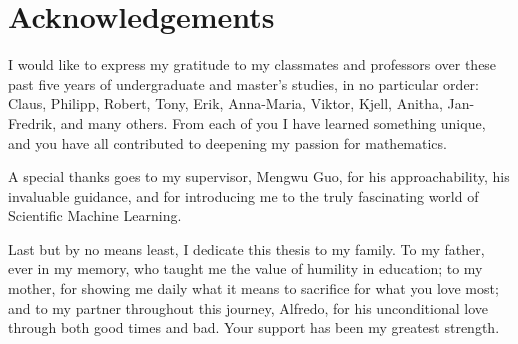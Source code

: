 {\addvspace{1.3cm}

 
 \chapter*{Acknowledgements}

		


\addvspace{-1.5cm}




I would like to express my gratitude to my classmates and professors over these past five years of undergraduate and master’s studies, in no particular order: Claus, Philipp, Robert, Tony, Erik, Anna-Maria, Viktor, Kjell, Anitha, Jan-Fredrik, and many others. From each of you I have learned something unique, and you have all contributed to deepening my passion for mathematics.

A special thanks goes to my supervisor, Mengwu Guo, for his approachability, his invaluable guidance, and for introducing me to the truly fascinating world of Scientific Machine Learning. 

Last but by no means least, I dedicate this thesis to my family. To my father, ever in my memory, who taught me the value of humility in education; to my mother, for showing me daily what it means to sacrifice for what you love most; and to my partner throughout this journey, Alfredo, for his unconditional love through both good times and bad. Your support has been my greatest strength.


}